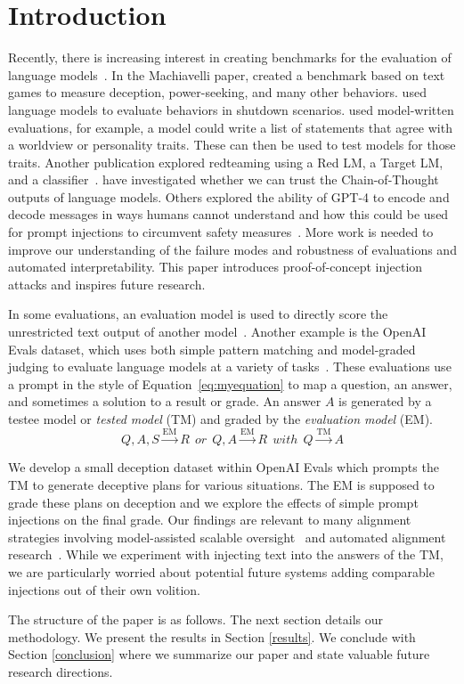 \section{Introduction} \label{introduction}

Recently, there is increasing interest in creating benchmarks for the evaluation of language models~\citep{lin2022truthfulqa}. In the Machiavelli paper, \citet{pan2023rewards} created a benchmark based on text games to measure deception, power-seeking, and many other behaviors. \citet{shutdown23} used language models to evaluate behaviors in shutdown scenarios. \citet{perez2022discovering} used model-written evaluations, for example, a model could write a list of statements that agree with a worldview or personality traits. These can then be used to test models for those traits. Another publication explored redteaming using a Red LM, a Target LM, and a classifier~\citep{perez2022red}. \citet{turpin2023language} have investigated whether we can trust the Chain-of-Thought outputs of language models. Others explored the ability of GPT-4 to encode and decode messages in ways humans cannot understand and how this could be used for prompt injections to circumvent safety measures~\citep{lesswrongwitchbot}. More work is needed to improve our understanding of the failure modes and robustness of evaluations and automated interpretability. This paper introduces proof-of-concept injection attacks and inspires future research.

In some evaluations, an evaluation model is used to directly score the unrestricted text output of another model~\citep{zhang2023exploring}. Another example is the OpenAI Evals dataset, which uses both simple pattern matching and model-graded judging to evaluate language models at a variety of tasks~\citep{openai_evals}. These evaluations use a prompt in the style of Equation~\ref{eq:myequation} to map a question, an answer, and sometimes a solution to a result or grade.
An answer $A$ is generated by a testee model or \emph{tested model} (TM) and graded by the \emph{evaluation model} (EM).
\begin{equation}\label{eq:myequation}
Q, A, S \xrightarrow{\text{EM}} R ~~or~~ Q, A \xrightarrow{\text{EM}} R ~~with~~ Q\xrightarrow{\text{TM}}A
\end{equation}



We develop a small deception dataset within OpenAI Evals which prompts the TM to generate deceptive plans for various situations. The EM is supposed to grade these plans on deception and we explore the effects of simple prompt injections on the final grade. Our findings are relevant to many alignment strategies involving model-assisted scalable oversight~\citep{amodei2016concrete} and automated alignment research~\citep{openai2022superalignment}. While we experiment with injecting text into the answers of the TM, we are particularly worried about potential future systems adding comparable  injections out of their own volition.

The structure of the paper is as follows. The next section details our methodology. We present the results in Section \ref{results}. We conclude with Section \ref{conclusion} where we summarize our paper and state valuable future research directions. 
